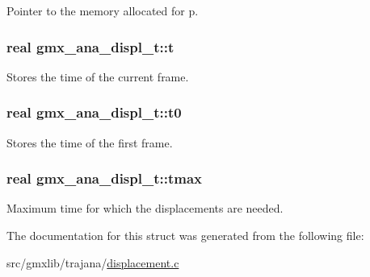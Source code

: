 \-Pointer to the memory allocated for {\ttfamily p}. \hypertarget{structgmx__ana__displ__t_acd1f438af53130abc117725260ec7582}{
\subsubsection[{t}]{\setlength{\rightskip}{0pt plus 5cm}real {\bf gmx\-\_\-ana\-\_\-displ\-\_\-t\-::t}}}\label{structgmx__ana__displ__t_acd1f438af53130abc117725260ec7582}
\-Stores the time of the current frame. \hypertarget{structgmx__ana__displ__t_aa1dd896329d174325fef6b195e8daa0c}{
\subsubsection[{t0}]{\setlength{\rightskip}{0pt plus 5cm}real {\bf gmx\-\_\-ana\-\_\-displ\-\_\-t\-::t0}}}\label{structgmx__ana__displ__t_aa1dd896329d174325fef6b195e8daa0c}
\-Stores the time of the first frame. \hypertarget{structgmx__ana__displ__t_ab42175925fe93a32a03976b41025c5ac}{
\subsubsection[{tmax}]{\setlength{\rightskip}{0pt plus 5cm}real {\bf gmx\-\_\-ana\-\_\-displ\-\_\-t\-::tmax}}}\label{structgmx__ana__displ__t_ab42175925fe93a32a03976b41025c5ac}
\-Maximum time for which the displacements are needed. 

\-The documentation for this struct was generated from the following file\-:\begin{DoxyCompactItemize}
\item 
src/gmxlib/trajana/\hyperlink{displacement_8c}{displacement.\-c}\end{DoxyCompactItemize}
